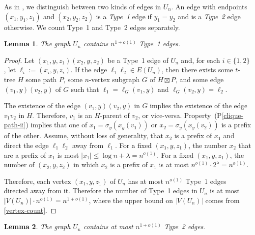\documentclass{patmorin}
\newcommand{\pref}[1]{(P\ref{#1})}
\newtheorem{lemma}{Lemma}
\begin{document}
As in \cite{esperet.joret.ea:sparse}, we distinguish between two kinds of edges in $U_n$.  An edge with endpoints $(x_1,y_1,z_1)$ and $(x_2,y_2,z_2)$ is a \emph{Type~1} edge if $y_1=y_2$ and is a \emph{Type~2} edge otherwise.  We count Type~1 and Type~2 edges separately.

\begin{lemma}\label{flat-edges}
    The graph $U_n$ contains $n^{1+o(1)}$ Type~1 edges.
\end{lemma}

\begin{proof}
    Let $(x_1,y,z_1)(x_2,y,z_2)$ be a Type~1 edge of $U_n$ and, for each $i\in\{1,2\}$, let $\ell_i:=(x_i,y,z_i)$.  If the edge $\ell_1\ell_2\in E(U_n)$, then there exists some $t$-tree $H$ some path $P$, some $n$-vertex subgraph $G$ of $H\boxtimes P$, and some edge $(v_1,y)(v_2,y)$ of $G$ such that $\ell_1=\ell_G(v_1,y)$ and $\ell_G(v_2,y)=\ell_2$.

    The existence of the edge $(v_1,y)(v_2,y)$ in $G$ implies the existence of the edge $v_1v_2$ in $H$.  Therefore, $v_1$ is an $H$-parent of $v_2$, or vice-versa. Property~\pref{clique-path-ii} implies that one of $x_1=\sigma_y(x_y(v_1))$ or $x_2=\sigma_y(x_y(v_2))$ is a prefix of the other.  Assume, without loss of generality, that $x_2$ is a prefix of $x_1$ and direct the edge $\ell_1\ell_2$ away from $\ell_1$.  For a fixed $(x_1,y,z_1)$, the number $x_2$ that are a prefix of $x_1$ is most $|x_1|\le\log n+\lambda=n^{o(1)}$. For a fixed $(x_1,y,z_1)$, the number of $(x_2,y,z_2)$ in which $x_2$ is a prefix of $x_1$ is at most $n^{o(1)}\cdot 2^{\lambda}=n^{o(1)}$.

    Therefore, each vertex $(x_1,y,z_1)$ of $U_n$ has at most $n^{o(1)}$ Type~1 edges directed away from it.  Therefore the number of Type~1 edges in $U_n$ is at most $|V(U_n)|\cdot n^{o(1)}=n^{1+o(1)}$, where the upper bound on $|V(U_n)|$ comes from \cref{vertex-count}.
\end{proof}

\begin{lemma}\label{vertical-edges}
    The graph $U_n$ contains at most $n^{1+o(1)}$ Type~2 edges.
\end{lemma}
\end{document}
